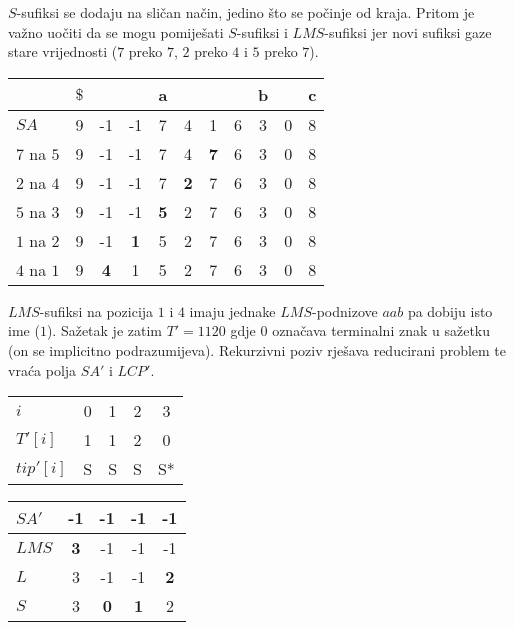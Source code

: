 \documentclass[times, utf8, proizvoljni, numeric]{fer}
\begin{document}
$S$-sufiksi se dodaju na sličan način, jedino što se počinje od kraja. Pritom je važno uočiti da se mogu pomiješati $S$-sufiksi i $LMS$-sufiksi jer novi sufiksi gaze stare vrijednosti ($7$ preko $7$, $2$ preko $4$ i $5$ preko $7$).

\begin{center}
	\begin{tabular}{l | c | c c c c c | c c c | c |}
		& $\$$ & & & a & & & & b & & c \\ \hline
		$SA$ & 9 & -1 & -1 & 7 & 4 & 1 & 6 & 3 & 0 & 8 \\ \hline
		$7$ na $5$ & 9 & -1 & -1 & 7 & 4 & \textbf{7} & 6 & 3 & 0 & 8 \\
		$2$ na $4$ & 9 & -1 & -1 & 7 & \textbf{2} & 7 & 6 & 3 & 0 & 8 \\
		$5$ na $3$ & 9 & -1 & -1 & \textbf{5} & 2 & 7 & 6 & 3 & 0 & 8 \\
		$1$ na $2$ & 9 & -1 & \textbf{1} & 5 & 2 & 7 & 6 & 3 & 0 & 8 \\
		$4$ na $1$ & 9 & \textbf{4} & 1 & 5 & 2 & 7 & 6 & 3 & 0 & 8 \\
	\end{tabular}
\end{center}

$LMS$-sufiksi na pozicija $1$ i $4$ imaju jednake $LMS$-podnizove $aab$ pa dobiju isto ime ($1$). Sažetak je zatim $T'=1120$ gdje $0$ označava terminalni znak u sažetku (on se implicitno podrazumijeva). Rekurzivni poziv rješava reducirani problem te vraća polja $SA'$ i $LCP'$.

\begin{center}
	\begin{tabular}{l | c c c c |}
		$i$ & 0 & 1 & 2 & 3 \\
		$T'[i]$ & 1 & 1 & 2 & 0 \\
		$tip'[i]$ & S & S & S & S* \\
	\end{tabular}
\end{center}

\begin{center}
	\begin{tabular}{l | c | c c | c |}
		$SA'$ & -1 & -1 & -1 & -1 \\ \hline
		$LMS$ & \textbf{3} & -1 & -1 & -1 \\
		$L$ & 3 & -1 & -1 & \textbf{2} \\
		$S$ & 3 & \textbf{0} & \textbf{1} & 2 \\ \hline
	\end{tabular}
\end{center}
\end{document}
